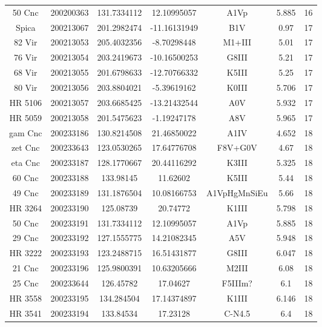 \begin{table*}
\begin{tabular}{ccccccc}
50 Cnc & 200200363 & 131.7334112 & 12.10995057 & A1Vp & 5.885 & 16 \\
Spica & 200213067 & 201.2982474 & -11.16131949 & B1V & 0.97 & 17 \\
82 Vir & 200213053 & 205.4032356 & -8.70298448 & M1+III & 5.01 & 17 \\
76 Vir & 200213054 & 203.2419673 & -10.16500253 & G8III & 5.21 & 17 \\
68 Vir & 200213055 & 201.6798633 & -12.70766332 & K5III & 5.25 & 17 \\
80 Vir & 200213056 & 203.8804021 & -5.39619162 & K0III & 5.706 & 17 \\
HR 5106 & 200213057 & 203.6685425 & -13.21432544 & A0V & 5.932 & 17 \\
HR 5059 & 200213058 & 201.5475623 & -1.19247178 & A8V & 5.965 & 17 \\
gam Cnc & 200233186 & 130.8214508 & 21.46850022 & A1IV & 4.652 & 18 \\
zet Cnc & 200233643 & 123.0530265 & 17.64776708 & F8V+G0V & 4.67 & 18 \\
eta Cnc & 200233187 & 128.1770667 & 20.44116292 & K3III & 5.325 & 18 \\
60 Cnc & 200233188 & 133.98145 & 11.62602 & K5III & 5.44 & 18 \\
49 Cnc & 200233189 & 131.1876504 & 10.08166753 & A1VpHgMnSiEu & 5.66 & 18 \\
HR 3264 & 200233190 & 125.08739 & 20.74772 & K1III & 5.798 & 18 \\
50 Cnc & 200233191 & 131.7334112 & 12.10995057 & A1Vp & 5.885 & 18 \\
29 Cnc & 200233192 & 127.1555775 & 14.21082345 & A5V & 5.948 & 18 \\
HR 3222 & 200233193 & 123.2488715 & 16.51431877 & G8III & 6.047 & 18 \\
21 Cnc & 200233196 & 125.9800391 & 10.63205666 & M2III & 6.08 & 18 \\
25 Cnc & 200233644 & 126.45782 & 17.04627 & F5IIIm? & 6.1 & 18 \\
HR 3558 & 200233195 & 134.284504 & 17.14374897 & K1III & 6.146 & 18 \\
HR 3541 & 200233194 & 133.84534 & 17.23128 & C-N4.5 & 6.4 & 18 \\
\hline
\end{tabular}
\end{table*}
